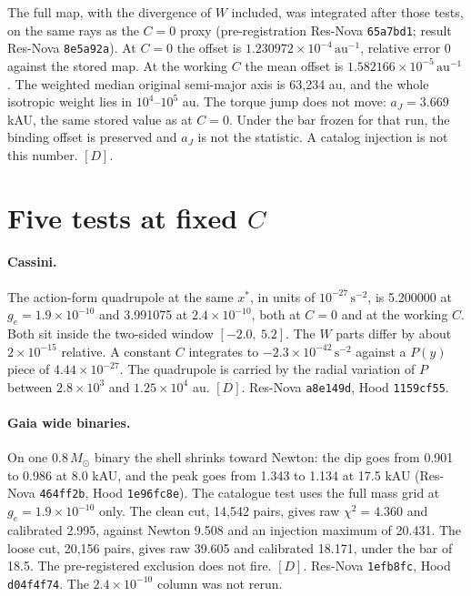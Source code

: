 \documentclass[11pt]{article}
\begin{document}
The full map, with the divergence of \(W\) included, was integrated after those tests, on the same rays as the \(C = 0\) proxy (pre-registration Res-Nova \texttt{65a7bd1}; result Res-Nova \texttt{8e5a92a}). At \(C = 0\) the offset is \(1.230972\times 10^{-4}\,\mathrm{au^{-1}}\), relative error 0 against the stored map. At the working \(C\) the mean offset is \(1.582166\times 10^{-5}\,\mathrm{au^{-1}}\). The weighted median original semi-major axis is 63{,}234 au, and the whole isotropic weight lies in \(10^{4}\)--\(10^{5}\) au. The torque jump does not move: \(a_J = 3.669\) kAU, the same stored value as at \(C = 0\). Under the bar frozen for that run, the binding offset is preserved and \(a_J\) is not the statistic. A catalog injection is not this number. \([D]\).

\section{Five tests at fixed \(C\)}

\paragraph{Cassini.}
The action-form quadrupole at the same \(x^*\), in units of \(10^{-27}\,\mathrm{s^{-2}}\), is 5.200000 at \(g_e = 1.9\times 10^{-10}\) and 3.991075 at \(2.4\times 10^{-10}\), both at \(C = 0\) and at the working \(C\). Both sit inside the two-sided window \([-2.0,\ 5.2]\). The \(W\) parts differ by about \(2\times 10^{-15}\) relative. A constant \(C\) integrates to \(-2.3\times 10^{-42}\,\mathrm{s^{-2}}\) against a \(P(y)\) piece of \(4.44\times 10^{-27}\). The quadrupole is carried by the radial variation of \(P\) between \(2.8\times 10^{3}\) and \(1.25\times 10^{4}\) au. \([D]\). Res-Nova \texttt{a8e149d}, Hood \texttt{1159cf55}.

\paragraph{Gaia wide binaries.}
On one \(0.8\,M_\odot\) binary the shell shrinks toward Newton: the dip goes from 0.901 to 0.986 at 8.0 kAU, and the peak goes from 1.343 to 1.134 at 17.5 kAU (Res-Nova \texttt{464ff2b}, Hood \texttt{1e96fc8e}). The catalogue test uses the full mass grid at \(g_e = 1.9\times 10^{-10}\) only. The clean cut, 14{,}542 pairs, gives raw \(\chi^2 = 4.360\) and calibrated 2.995, against Newton 9.508 and an injection maximum of 20.431. The loose cut, 20{,}156 pairs, gives raw 39.605 and calibrated 18.171, under the bar of 18.5. The pre-registered exclusion does not fire. \([D]\). Res-Nova \texttt{1efb8fc}, Hood \texttt{d04f4f74}. The \(2.4\times 10^{-10}\) column was not rerun.
\end{document}
